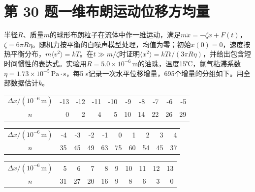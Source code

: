 \documentclass[UTF8,fontset=fandol,a4paper,11pt]{ctexart}
\begin{document}

\section*{第 30 题\quad 一维布朗运动位移方均量}

半径$R$、质量$m$的球形布朗粒子在流体中作一维运动，满足$m\ddot x=-\zeta\dot x+F(t)$，$\zeta=6\pi R\eta$。随机力按平衡的白噪声模型处理，均值为零；初始$x(0)=0$，速度按热平衡分布，$m\langle v^2\rangle=kT$。在$t\gg m/\zeta$时证明$\langle x^2\rangle=kTt/(3\pi R\eta)$，并给出包含短时间惯性的表达式。实验用$R=5.0\times10^{-6}\,\mathrm m$的油珠，温度15℃，氮气粘滞系数$\eta=1.73\times10^{-5}\,\mathrm{Pa\cdot s}$，每5 s记录一次水平位移增量，695个增量的分组如下。用全部数据估计$k$。
\begin{center}\small\begin{tabular}{c|rrrrrrrrr}\toprule$\Delta x/(10^{-6}\,\mathrm m)$ & -13 & -12 & -11 & -10 & -9 & -8 & -7 & -6 & -5\\$n$ & 0 & 2 & 4 & 5 & 10 & 14 & 22 & 26 & 29\\\bottomrule\end{tabular}\end{center}
\begin{center}\small\begin{tabular}{c|rrrrrrrrr}\toprule$\Delta x/(10^{-6}\,\mathrm m)$ & -4 & -3 & -2 & -1 & 0 & 1 & 2 & 3 & 4\\$n$ & 35 & 45 & 49 & 63 & 75 & 60 & 54 & 45 & 37\\\bottomrule\end{tabular}\end{center}
\begin{center}\small\begin{tabular}{c|rrrrrrrrr}\toprule$\Delta x/(10^{-6}\,\mathrm m)$ & 5 & 6 & 7 & 8 & 9 & 10 & 11 & 12 & 13\\$n$ & 31 & 27 & 20 & 16 & 9 & 8 & 6 & 3 & 0\\\bottomrule\end{tabular}\end{center}
\end{document}

